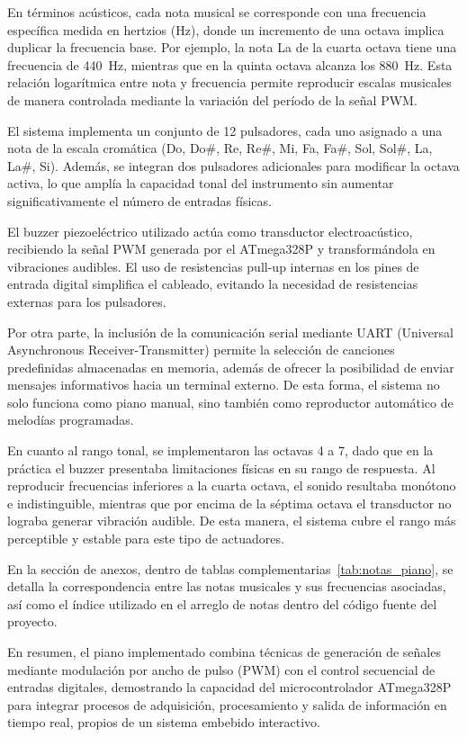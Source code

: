 En términos acústicos, cada nota musical se corresponde con una frecuencia específica medida en hertzios (Hz), donde un incremento de una octava implica duplicar la frecuencia base. 
Por ejemplo, la nota La de la cuarta octava tiene una frecuencia de 440~Hz, mientras que en la quinta octava alcanza los 880~Hz. 
Esta relación logarítmica entre nota y frecuencia permite reproducir escalas musicales de manera controlada mediante la variación del período de la señal PWM.

El sistema implementa un conjunto de 12 pulsadores, cada uno asignado a una nota de la escala cromática (Do, Do\#, Re, Re\#, Mi, Fa, Fa\#, Sol, Sol\#, La, La\#, Si). 
Además, se integran dos pulsadores adicionales para modificar la octava activa, lo que amplía la capacidad tonal del instrumento sin aumentar significativamente el número de entradas físicas.

El buzzer piezoeléctrico utilizado actúa como transductor electroacústico, recibiendo la señal PWM generada por el ATmega328P y transformándola en vibraciones audibles. 
El uso de resistencias pull-up internas en los pines de entrada digital simplifica el cableado, evitando la necesidad de resistencias externas para los pulsadores.

Por otra parte, la inclusión de la comunicación serial mediante UART (Universal Asynchronous Receiver-Transmitter) permite la selección de canciones predefinidas almacenadas en memoria, 
además de ofrecer la posibilidad de enviar mensajes informativos hacia un terminal externo. 
De esta forma, el sistema no solo funciona como piano manual, sino también como reproductor automático de melodías programadas.

En cuanto al rango tonal, se implementaron las octavas 4 a 7, dado que en la práctica el buzzer presentaba limitaciones físicas en su rango de respuesta. 
Al reproducir frecuencias inferiores a la cuarta octava, el sonido resultaba monótono e indistinguible, mientras que por encima de la séptima octava el transductor no lograba generar vibración audible. 
De esta manera, el sistema cubre el rango más perceptible y estable para este tipo de actuadores.

En la sección de anexos, dentro de tablas complementarias~\ref{tab:notas_piano}, 
se detalla la correspondencia entre las notas musicales y sus frecuencias asociadas, 
así como el índice utilizado en el arreglo de notas dentro del código fuente del proyecto.

En resumen, el piano implementado combina técnicas de generación de señales mediante modulación por ancho de pulso (PWM) con el control secuencial de entradas digitales, demostrando la capacidad del microcontrolador ATmega328P para integrar procesos de adquisición, procesamiento y salida de información en tiempo real, propios de un sistema embebido interactivo.

